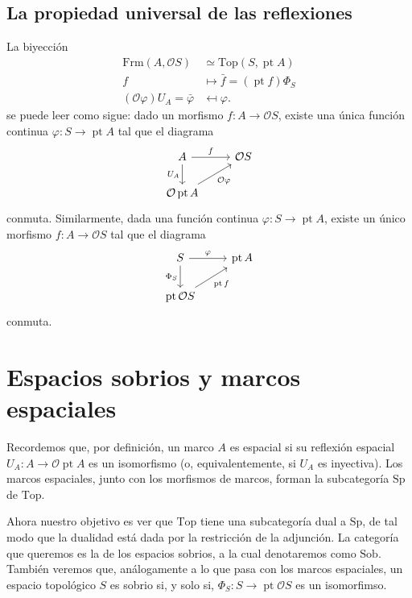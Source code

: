 \documentclass[12pt,letterpaper,titlepage]{article}
\theoremstyle{definition}
\renewcommand\phi{\varphi}
\renewcommand\cal[1]{\mathcal{#1}}
\newcommand\<{\langle}
\renewcommand\>{\rangle}
\newcommand{\Frm}{\mathrm{Frm}}
\newcommand{\Top}{\mathrm{Top}}
\newcommand{\Sp}{\mathrm{Sp}}
\newcommand{\Sob}{\mathrm{Sob}}
\DeclareMathOperator{\pt}{pt}
\begin{document}
\subsection{La propiedad universal de las reflexiones}
La biyección
\begin{align*}
    \Frm(A,\cal OS) &\simeq \Top(S,\pt A) \\
    f &\mapsto \bar f = (\pt f)\Phi_S \\
    (\cal O\phi)U_A = \bar\phi &\mapsfrom \phi.
\end{align*}
se puede leer como sigue:
dado un morfismo $f:A\to\cal OS$, existe una única función continua
$\phi:S\to\pt A$ tal que el diagrama
\[
    \begin{tikzcd}
        A \ar[r,"f"] \ar[d,"U_A"'] & \cal OS \\
        \cal O\pt A \ar[ur,"\cal O\phi"']
    \end{tikzcd}
\]
conmuta.
Similarmente, dada una función continua $\phi:S\to\pt A$, existe
un único morfismo $f:A\to\cal OS$ tal que el diagrama
\[
    \begin{tikzcd}
        S \ar[r,"\phi"] \ar[d,"\Phi_S"'] & \pt A \\
        \pt\cal OS \ar[ur,"\pt f"']
    \end{tikzcd}
\]
conmuta.


\section{Espacios sobrios y marcos espaciales}

Recordemos que, por definición, un marco $A$ es espacial si
su reflexión espacial $U_A:A\to\cal O\pt A$ es un isomorfismo
(o, equivalentemente, si $U_A$ es inyectiva).
Los marcos espaciales, junto con los morfismos de marcos,
forman la subcategoría $\Sp$ de $\Top$.

Ahora nuestro objetivo es ver que $\Top$ tiene una subcategoría
dual a $\Sp$, de tal modo que la dualidad
está dada por la restricción de la adjunción.
La categoría que queremos es la de los espacios sobrios,
a la cual denotaremos como $\Sob$.
También veremos que, análogamente a lo que pasa
con los marcos espaciales, un espacio topológico $S$ es sobrio
si, y solo si, $\Phi_S:S\to\pt\cal OS$ es un isomorfimso.
\end{document}

